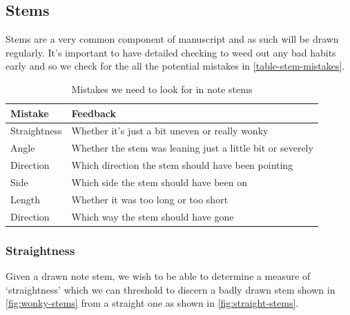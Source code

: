 \subsection{Stems}

Stems are a very common component of manuscript and as such will be drawn regularly. It's important to have detailed checking to weed out any bad habits early and so we check for the all the potential mistakes in \cref{table-stem-mistakes}.

\begin{table}[H]
    \renewcommand{\arraystretch}{1.6}
    \begin{tabularx}{\textwidth}{ lX }
        \toprule
        Mistake & Feedback \\
        \midrule
        Straightness & Whether it's just a bit uneven or really wonky \\
        Angle & Whether the stem was leaning just a little bit or severely \\
        Direction & Which direction the stem should have been pointing \\
        Side & Which side the stem should have been on \\
        Length & Whether it was too long or too short\\
        Direction & Which way the stem should have gone\\
        \bottomrule
    \end{tabularx}

    \caption{Mistakes we need to look for in note stems}
    \label{table:stem-mistakes}
\end{table}

\subsubsection{Straightness}

Given a drawn note stem, we wish to be able to determine a measure of `straightness' which we can threshold to discern a badly drawn stem shown in \cref{fig:wonky-stems} from a straight one  as shown in \cref{fig:straight-stems}.


